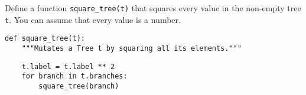 \question 
Define a function \texttt{square\_tree(t)} that squares every value in
the non-empty tree \texttt{t}. You can assume that every value is a number.

\begin{lstlisting}
def square_tree(t):
    """Mutates a Tree t by squaring all its elements."""
\end{lstlisting}
\begin{solution}[0.7in]
\begin{lstlisting}
    t.label = t.label ** 2
    for branch in t.branches:
        square_tree(branch)
\end{lstlisting}
\end{solution}
